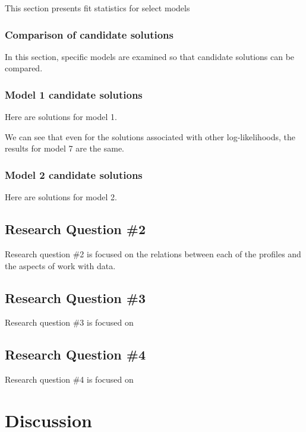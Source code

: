 \documentclass[]{msu-thesis}
\theoremstyle{definition}
\theoremstyle{definition}
\theoremstyle{definition}
\theoremstyle{remark}
\begin{document}
This section presents fit statistics for select models

\subsection{Comparison of candidate
solutions}\label{comparison-of-candidate-solutions}

In this section, specific models are examined so that candidate
solutions can be compared.

\subsection{Model 1 candidate
solutions}\label{model-1-candidate-solutions}

Here are solutions for model 1.

We can see that even for the solutions associated with other
log-likelihoods, the results for model 7 are the same.

\subsection{Model 2 candidate
solutions}\label{model-2-candidate-solutions}

Here are solutions for model 2.

\section{Research Question \#2}\label{research-question-2}

Research question \#2 is focused on the relations between each of the
profiles and the aspects of work with data.

\section{Research Question \#3}\label{research-question-3}

Research question \#3 is focused on

\section{Research Question \#4}\label{research-question-4}

Research question \#4 is focused on

\chapter{Discussion}\label{discussion}
\end{document}
